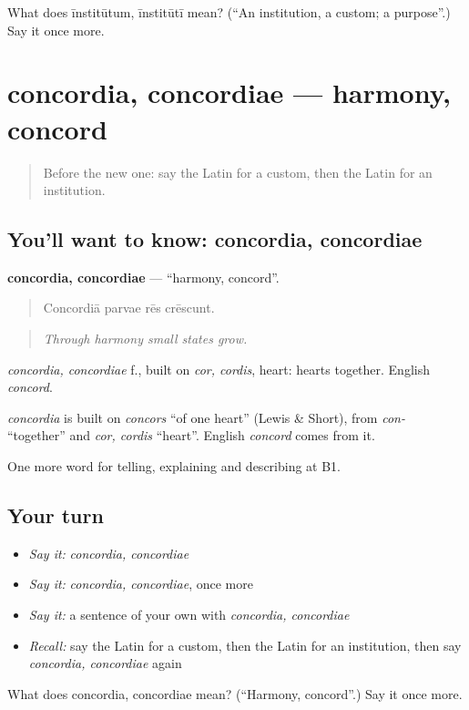 \begin{tcolorbox}[breakable,colback=teal!4,colframe=teal!35!black,title={Before you move on}]
What does īnstitūtum, īnstitūtī mean? (\textquotedblleft{}An institution, a custom; a purpose\textquotedblright{}.) Say it once more.
\end{tcolorbox}
\section[concordia, concordiae]{concordia, concordiae — harmony, concord}

\label{lesson:LA-C386-concordia}



\begin{quote}
Before the new one: say the Latin for a custom, then the Latin for an institution.
\end{quote}

\subsection*{You'll want to know: concordia, concordiae}
\textbf{concordia, concordiae} — \textquotedblleft{}harmony, concord\textquotedblright{}.

\begin{quote}
Concordiā parvae rēs crēscunt.
\end{quote}

\begin{quote}
\emph{Through harmony small states grow.}
\end{quote}

\emph{concordia, concordiae} f., built on \emph{cor, cordis}, heart: hearts together. English \emph{concord}.

\begin{cousinweb}
\emph{concordia} is built on \emph{concors} \textquotedblleft{}of one heart\textquotedblright{} (Lewis \& Short), from \emph{con-} \textquotedblleft{}together\textquotedblright{} and \emph{cor, cordis} \textquotedblleft{}heart\textquotedblright{}. English \emph{concord} comes from it.
\end{cousinweb}

\begin{grammarlens}[title={What you've built}]
One more word for telling, explaining and describing at B1.
\end{grammarlens}

\subsection*{Your turn}
\begin{itemize}
\raggedright
  \item \emph{Say it:} \emph{concordia, concordiae}
  \item \emph{Say it:} \emph{concordia, concordiae}, once more
  \item \emph{Say it:} a sentence of your own with \emph{concordia, concordiae}
  \item \emph{Recall:} say the Latin for a custom, then the Latin for an institution, then say \emph{concordia, concordiae} again
\end{itemize}

\begin{tcolorbox}[breakable,colback=teal!4,colframe=teal!35!black,title={Before you move on}]
What does concordia, concordiae mean? (\textquotedblleft{}Harmony, concord\textquotedblright{}.) Say it once more.
\end{tcolorbox}
